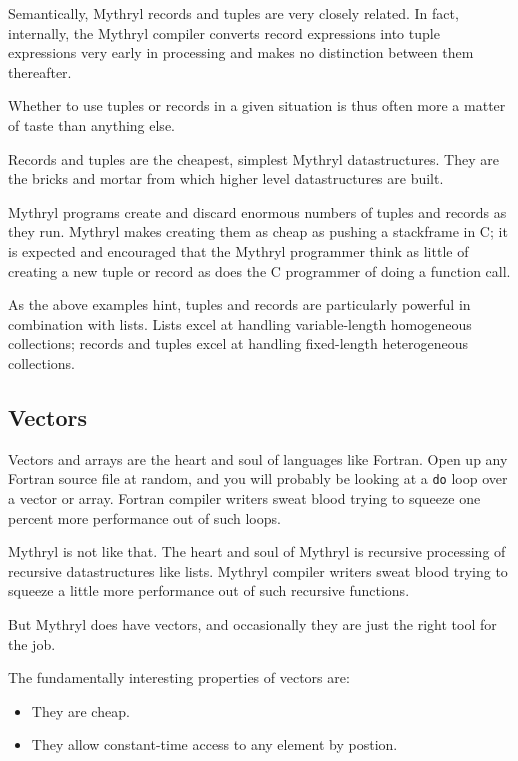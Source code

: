 Semantically, Mythryl records and tuples are very closely related.  In 
fact, internally, the Mythryl compiler converts record expressions 
into tuple expressions very early in processing and makes no 
distinction between them thereafter.

Whether to use tuples or records in a given situation is thus often more 
a matter of taste than anything else.

Records and tuples are the cheapest, simplest Mythryl datastructures. 
They are the bricks and mortar from which higher level datastructures 
are built.

Mythryl programs create and discard 
enormous numbers of tuples and records as they run.  Mythryl makes creating 
them as cheap as pushing a stackframe in C;  it is expected and encouraged 
that the Mythryl programmer think as little of creating a new tuple or 
record as does the C programmer of doing a function call.

As the above examples hint, tuples and records are particularly 
powerful in combination with lists.  Lists excel at handling 
variable-length homogeneous collections; records and tuples excel at 
handling fixed-length heterogeneous collections.

\cutend*


\subsection{Vectors}
\label{section:tut:delving-deeper:vectors}

Vectors and arrays are the heart and soul of languages like Fortran.  Open up 
any Fortran source file at random, and you will probably be looking at a 
{\tt do} loop over a vector or array.  Fortran compiler writers sweat blood 
trying to squeeze one percent more performance out of such loops.

Mythryl is not like that.  The heart and soul of Mythryl is recursive processing 
of recursive datastructures like lists.  Mythryl compiler writers sweat blood 
trying to squeeze a little more performance out of such recursive functions. 

But Mythryl does have vectors, and occasionally they are just the right tool 
for the job.

The fundamentally interesting properties of vectors are:

\begin{itemize}
\item They are cheap.
\item They allow constant-time access to any element by postion.
\end{itemize}

